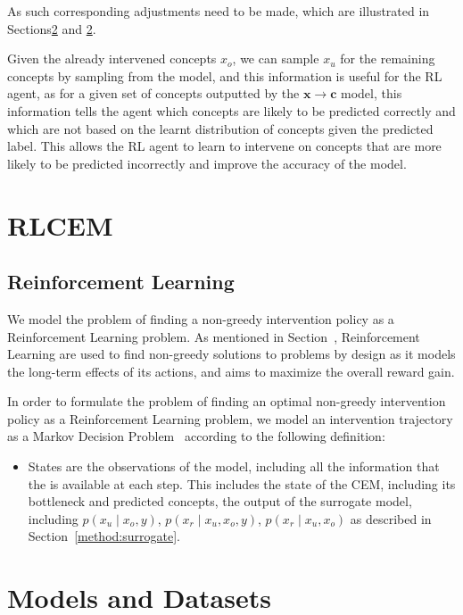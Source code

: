 \documentclass[../main.tex]{subfiles}
\begin{document}
As such corresponding adjustments need to be made, which are illustrated in Sections\ref{} and \ref{}.

Given the already intervened concepts $x_o$, we can sample $x_u$ for the remaining concepts by sampling from the model, 
and this information is useful for the RL agent, as for a given set of concepts outputted by 
the $\mathbf{x} \to \mathbf{c}$ model, this information tells the agent which concepts are likely
to be predicted correctly and which are not based on the learnt distribution of concepts given the
predicted label. This allows the RL agent to learn to intervene on concepts that are 
more likely to be predicted incorrectly and improve the accuracy of the model.


\section{RLCEM}\label{method:rlcem}


\subsection{Reinforcement Learning}

We model the problem of finding a non-greedy intervention policy as a 
Reinforcement Learning problem. As mentioned in Section~\cite{background:rl},
Reinforcement Learning are used to find non-greedy solutions to problems
by design as it models the long-term effects of its actions, and aims to 
maximize the overall reward gain. 

In order to formulate the problem of finding an optimal non-greedy intervention policy
as a Reinforcement Learning problem, we model an intervention
trajectory as a Markov Decision Problem~\cite{rl-mdp} according
to the following definition:
\begin{itemize}
    \item States are the observations of the model, including all the information that the is available
    at each step. This includes the state of the CEM, including its bottleneck and predicted concepts,
    the output of the surrogate model, including $p(x_u \mid x_o, y)$, $p(x_r \mid x_u, x_o, y)$,
    $p(x_r \mid x_u, x_o)$ as described in Section~\ref{method:surrogate}.
\end{itemize}

\section{Models and Datasets}
\end{document}
